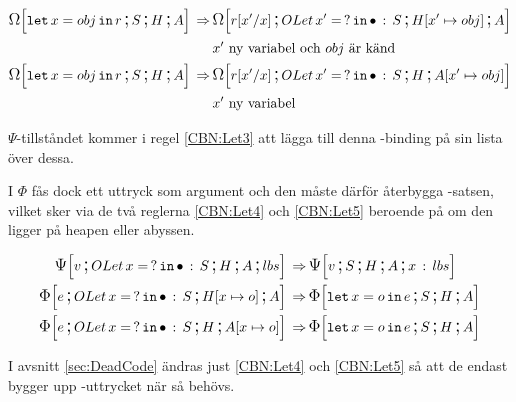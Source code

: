 \documentclass[../Optimise]{subfiles}
\begin{document}
\begin{align}
\label{CBN:Let1} \CBNOMEGA SHA{\eLet x{obj}r} \rulesep & \CBNOMEGA {\cOLet{x'}S}{\heap{x'}{obj}}A{\subst r{x'}x}\\
   & x'\mbox{ ny variabel och } obj \text{ är känd}\nonumber \\
\label{CBN:Let2} \CBNOMEGA SHA{\eLet x{obj}r} \rulesep & \CBNOMEGA{\cOLet{x'}S}H{\abyss{x'}{obj}}{\subst r{x'}x}\\
   & x'\mbox{ ny variabel} \nonumber 
\end{align}

$\Psi$-tillståndet kommer i regel \eqref{CBN:Let3} att lägga till denna -binding
på sin lista över dessa.

 I $\Phi$ fås dock ett uttryck som argument och den måste därför 
återbygga -satsen, vilket sker via de två reglerna \eqref{CBN:Let4} och 
\eqref{CBN:Let5} beroende på om den ligger på heapen eller abyssen.

\begin{align}
\label{CBN:Let3} \CBNPSI{\cOLet xS}H A{lbs}v \rulesep & \CBNPSI SHA{x\,:\, lbs}v \\
\label{CBN:Let4} \CBNIRR{\cOLet xS}{\heap xo}Ae \rulesep & \CBNIRR SHA{\eLet xoe} \\
\label{CBN:Let5} \CBNIRR{\cOLet xS}H{\abyss xo}e \rulesep & \CBNIRR SHA{\eLet xoe}
\end{align}


I avsnitt \ref{sec:DeadCode} ändras just \eqref{CBN:Let4} 
och \eqref{CBN:Let5} så att de endast bygger upp -uttrycket när så behövs.


\end{document}
